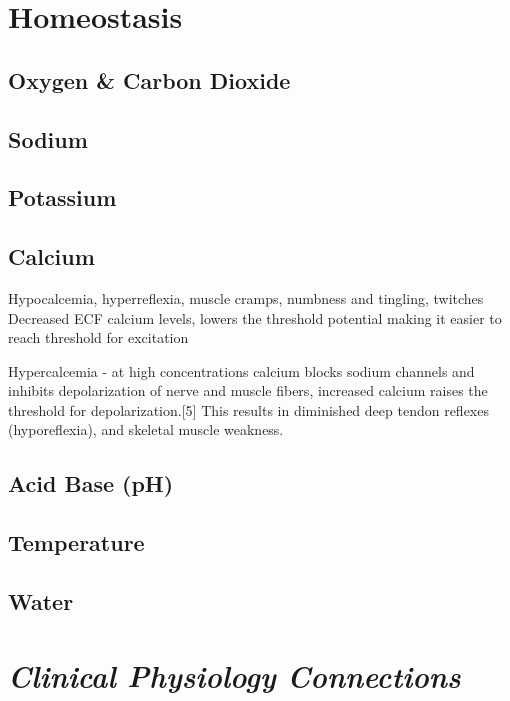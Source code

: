 \section{Homeostasis}

\subsection{Oxygen \& Carbon Dioxide}

\subsection{Sodium}

\subsection{Potassium}

\subsection{Calcium}

Hypocalcemia, hyperreflexia, muscle cramps, numbness and tingling, twitches
Decreased ECF calcium levels, lowers the threshold potential making it easier to reach threshold for excitation

Hypercalcemia - at high concentrations calcium blocks sodium channels and inhibits depolarization of nerve and muscle fibers, increased calcium raises the threshold for depolarization.[5] This results in diminished deep tendon reflexes (hyporeflexia), and skeletal muscle weakness.

\subsection{Acid Base (pH)}

\subsection{Temperature}

\subsection{Water}



\section{\textit{Clinical Physiology Connections}}

